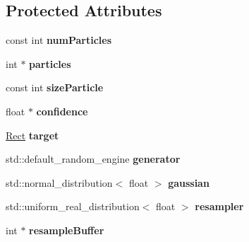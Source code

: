 \subsection*{Protected Attributes}
\begin{DoxyCompactItemize}
\item 
\hypertarget{classParticleFilter_a76cca3c44c00837d85751bb913280361}{}const int {\bfseries num\+Particles}\label{classParticleFilter_a76cca3c44c00837d85751bb913280361}

\item 
\hypertarget{classParticleFilter_a0175a0c46621095d013e8fc539b94eed}{}int $\ast$ {\bfseries particles}\label{classParticleFilter_a0175a0c46621095d013e8fc539b94eed}

\item 
\hypertarget{classParticleFilter_affbf0bd98b03f8c047db2106c40ecfd1}{}const int {\bfseries size\+Particle}\label{classParticleFilter_affbf0bd98b03f8c047db2106c40ecfd1}

\item 
\hypertarget{classParticleFilter_a68e04e60c13a06afc10bcce6b4d056b6}{}float $\ast$ {\bfseries confidence}\label{classParticleFilter_a68e04e60c13a06afc10bcce6b4d056b6}

\item 
\hypertarget{classParticleFilter_aa97f15d13d905348953cdc3122871255}{}\hyperlink{classRect}{Rect} {\bfseries target}\label{classParticleFilter_aa97f15d13d905348953cdc3122871255}

\item 
\hypertarget{classParticleFilter_a10b276ac5acdc39a1c7f5fc89dc9529d}{}std\+::default\+\_\+random\+\_\+engine {\bfseries generator}\label{classParticleFilter_a10b276ac5acdc39a1c7f5fc89dc9529d}

\item 
\hypertarget{classParticleFilter_a861497b4329e28e078d7ebfa381baae9}{}std\+::normal\+\_\+distribution$<$ float $>$ {\bfseries gaussian}\label{classParticleFilter_a861497b4329e28e078d7ebfa381baae9}

\item 
\hypertarget{classParticleFilter_aa6149560d37c102c0e96b2b0cd9b696b}{}std\+::uniform\+\_\+real\+\_\+distribution$<$ float $>$ {\bfseries resampler}\label{classParticleFilter_aa6149560d37c102c0e96b2b0cd9b696b}

\item 
\hypertarget{classParticleFilter_a23a3c5e7016d74cf775031b612c19839}{}int $\ast$ {\bfseries resample\+Buffer}\label{classParticleFilter_a23a3c5e7016d74cf775031b612c19839}

\end{DoxyCompactItemize}


